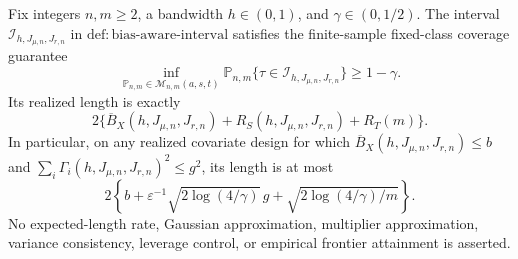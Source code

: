 Fix integers \(n,m\ge2\), a bandwidth \(h\in(0,1)\), and \(\gamma\in(0,1/2)\). The interval \(\mathcal I_{h,J_{\mu,n},J_{r,n}}\) in \(\mathrm{def:bias\text{-}aware\text{-}interval}\) satisfies the finite-sample fixed-class coverage guarantee
\[
\inf_{\mathbb P_{n,m}\in\mathcal M_{n,m}(a,s,t)}
\mathbb P_{n,m}\{\tau\in\mathcal I_{h,J_{\mu,n},J_{r,n}}\}\ge1-\gamma.
\]
Its realized length is exactly
\[
2\{\overline B_X(h,J_{\mu,n},J_{r,n})+R_S(h,J_{\mu,n},J_{r,n})+R_T(m)\}.
\]
In particular, on any realized covariate design for which \(\overline B_X(h,J_{\mu,n},J_{r,n})\le b\) and \(\sum_i\Gamma_i(h,J_{\mu,n},J_{r,n})^2\le g^2\), its length is at most
\[
2\left\{b+\varepsilon^{-1}\sqrt{2\log(4/\gamma)}\,g+\sqrt{2\log(4/\gamma)/m}\right\}.
\]
No expected-length rate, Gaussian approximation, multiplier approximation, variance consistency, leverage control, or empirical frontier attainment is asserted.